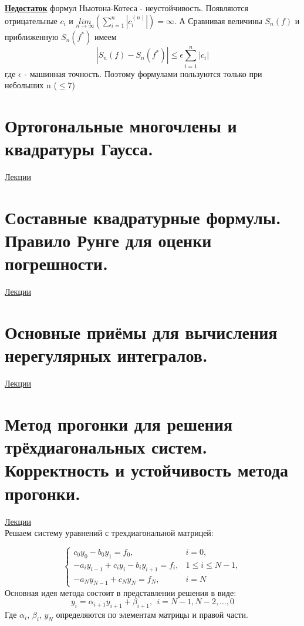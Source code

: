 \documentclass[specialist, subf, href, colorlinks=true, 12pt, times, mtpro, final]{disser}
\theoremstyle{definition}
\begin{document}
	\textbf{\hyperlink {lects.39}{Недостаток}} формул Ньютона-Котеса - неустойчивость. Появляются отрицательные $c_i$ и $\underset{n\rightarrow \infty}{lim} \left(\sum\limits_{i=1}^n |c_i^{(n)}| \right) = \infty$. А Сравнивая величины $S_n(f)$ и приближенную $S_n(f^*)$ имеем 
	$$
		|S_n(f) - S_n(f^*)| \le \epsilon \sum\limits_{i = 1}^n |c_i|
	$$
	где $\epsilon$ - машинная точность. Поэтому формулами пользуются только при небольших n ($\le7$)

\section {Ортогональные многочлены и квадратуры Гаусса.}
	\hyperlink {lects.40}{Лекции}\\
	

\section {Составные квадратурные формулы. Правило Рунге для оценки погрешности.}
	\hyperlink {lects.44}{Лекции}\\

\section {Основные приёмы для вычисления нерегулярных интегралов.}
	\hyperlink {lects.45}{Лекции}\\

\section {Метод прогонки для решения трёхдиагональных систем. Корректность и устойчивость метода прогонки.}
	\hyperlink {lects.48}{Лекции}\\
	Решаем систему уравнений с трехдиагональной матрицей:
	
	\begin{equation*}
	 \begin{cases}
	   c_0 y_0 - b_0 y_1 = f_0, &i = 0,\\
	   -a_i y_{i-1} + c_i y_i - b_i y_{i+1} = f_i, &1 \le i \le N-1, \\
	   -a_N y_{N-1} + c_N y_N = f_N, & i = N
	 \end{cases}
	\end{equation*}
	Основная идея метода состоит в представлении решения в виде:
	$$y_i = \alpha_{i+1} y_{i+1} + \beta_{i+1}, \ \ i = N-1, N-2, \dots , 0$$
	Где $\alpha_i$, $\beta_i$, $y_N$ определяются по элементам матрицы и правой части.
	
\end{document}

